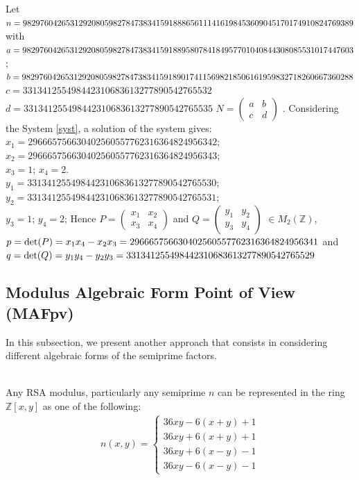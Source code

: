 \documentclass[sigconf,balance=false]{acmart}
\begin{document}
\begin{example} \ \\ \rm{
Let $n=9829760426531292080598278473834159188865611141619845\\3609045170174910824769389$
with $a=98297604265312920805982784\\738341591889580784184957701040844308085531017447603$; \\
$b=9829760426531292080598278473834159189017411569821850616\\1959832718260667360288$\\
$c=331341255498442310683613277890542765532$\\
$d=331341255498442310683613277890542765535$
$N=
\begin{pmatrix}
a & b \\ 
c & d
\end{pmatrix}$
}. Considering the System \ref{syst}, a solution of the system gives:
$x_{1}=296665756630402560557762316364824956342$; \\
$x_{2}=296665756630402560557762316364824956343$;\\
$x_{3}=1$; $x_{4}=2$.\\
$y_{1}=331341255498442310683613277890542765530$; \\
$y_{2}=331341255498442310683613277890542765531$; \\
$y_{3}=1$; $y_{4}=2$; Hence 
$P=
\begin{pmatrix}
x_{1} & x_{2} \\ 
x_{3} & x_{4}
\end{pmatrix} $ and $Q=
\begin{pmatrix}
y_{1} & y_{2} \\ 
y_{3} & y_{4}
\end{pmatrix}$ $\in \displaystyle  M_{2}\left(\mathbb{Z}\right)$,\\
 $p=\det(P)=x_{1}x_{4}-x_{2}x_{3}=29666575663040256055776231636482495\\6341$ and $q=\det(Q)=y_{1}y_{4}-y_{2}y_{3}=331341255498442310683613277\\890542765529$
\end{example}
\subsection{Modulus Algebraic Form Point of View (MAFpv)}
In this subsection, we present another approach that consists in considering different algebraic forms of the semiprime factors.
\begin{theorem} \ \\ \rm{
Any RSA modulus, particularly any semiprime $n$ can be represented in the ring $\mathbb{Z}[x, y]$ as one of the following:
\begin{eqnarray*}
n(x, y)=
\left\lbrace
\begin{array}{ll}
36xy-6(x+y)+1\\
36xy+6(x+y)+1\\
36xy+6(x-y)-1\\
36xy-6(x-y)-1
\end{array} \right.
\end{eqnarray*}
}
\end{theorem}
\end{document}
